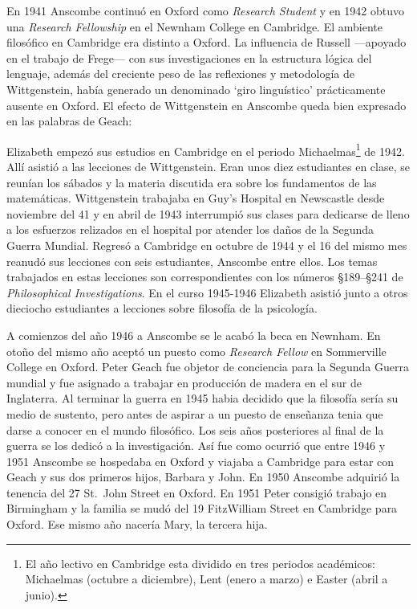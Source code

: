 En 1941 Anscombe continuó en Oxford como \emph{Research Student} y en 1942 obtuvo una \emph{Research Fellowship} en el Newnham College en Cambridge. El ambiente filosófico en Cambridge era distinto a Oxford. La influencia de Russell ---apoyado en el trabajo de Frege--- con sus investigaciones en la estructura lógica del lenguaje, además del creciente peso de las reflexiones y metodología de Wittgenstein, había generado un denominado `giro linguístico'\autocite[Cf.~][14]{geach1991philaut} prácticamente ausente en Oxford. El efecto de Wittgenstein en Anscombe queda bien expresado en las palabras de Geach: 

Elizabeth empezó sus estudios en Cambridge en el periodo Michaelmas\footnote{El año lectivo en Cambridge esta dividido en tres periodos académicos: Michaelmas (octubre a diciembre), Lent (enero a marzo) e Easter (abril a junio).} de 1942. Allí asistió a las lecciones de Wittgenstein. Eran unos diez estudiantes en clase, se reunían los sábados y la materia discutida era sobre los fundamentos de las matemáticas. Wittgenstein trabajaba en Guy's Hospital en Newscastle desde noviembre del 41 y en abril de 1943 interrumpió sus clases para dedicarse de lleno a los esfuerzos relizados en el hospital por atender los daños de la Segunda Guerra Mundial. Regresó a Cambridge en octubre de 1944 y el 16 del mismo mes reanudó sus lecciones con seis estudiantes, Anscombe entre ellos. Los temas trabajados en estas lecciones son correspondientes con los números \S189--\S241 de \emph{Philosophical Investigations}. En el curso 1945-1946 Elizabeth asistió junto a otros dieciocho estudiantes a lecciones sobre filosofía de la psicología.\autocite[Cf.~][354--356]{KlaggeNordman2003pubnpriv}

A comienzos del año 1946 a Anscombe se le acabó la beca en Newnham. En otoño del mismo año aceptó un puesto como \emph{Research Fellow} en Sommerville College en Oxford. Peter Geach fue objetor de conciencia para la Segunda Guerra mundial y fue asignado a trabajar en producción de madera en el sur de Inglaterra.\autocite[Cf.~][34]{teichman2002fellows} Al terminar la guerra en 1945 habia decidido que la filosofía sería su medio de sustento, pero antes de aspirar a un puesto de enseñanza tenia que darse a conocer en el mundo filosófico.\autocite[Cf.~][12]{geach1991philaut} Los seis años posteriores al final de la guerra se los dedicó a la investigación. Así fue como ocurrió que entre 1946 y 1951 Anscombe se hospedaba en Oxford y viajaba a Cambridge para estar con Geach y sus dos primeros hijos, Barbara y John. En 1950 Anscombe adquirió la tenencia del 27 St.~John Street en Oxford. En 1951 Peter consigió trabajo en Birmingham y la familia se mudó del 19 FitzWilliam Street en Cambridge para Oxford.\autocite[Cf.~][208]{NWR} Ese mismo año nacería Mary, la tercera hija.

